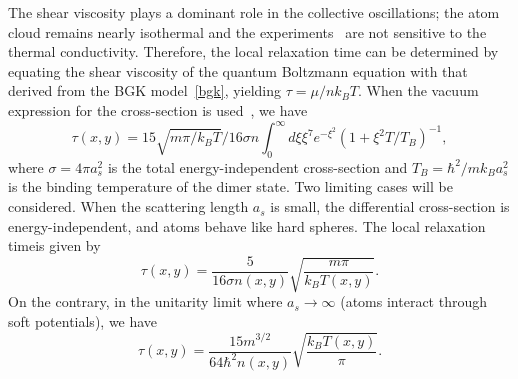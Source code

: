The shear viscosity plays a dominant role in the collective oscillations; the atom cloud remains nearly isothermal and the experiments~\cite{Kavoulakis1998,Braby2010} are not sensitive to the thermal conductivity. Therefore, the local relaxation time can be determined by equating the shear viscosity of the quantum Boltzmann equation with that derived from the BGK model~\eqref{bgk}, yielding $\tau=\mu/nk_BT$. When the vacuum expression for the cross-section is used~\cite{Massignan2005}, we have
\begin{equation}
\tau(x,y)={15}\sqrt{{m\pi}/{k_BT}}/{16\sigma n\int_0^\infty d\xi\xi^7e^{-\xi^2}(1+\xi^2T/T_B)^{-1}},
\end{equation} 
where $\sigma=4\pi a_s^2$ is the total energy-independent cross-section and $T_B=\hbar^2/mk_Ba_s^2$ is the binding temperature of the dimer state. Two limiting cases will be considered. When the scattering length $a_s$ is small, the differential cross-section is energy-independent, and atoms behave like hard spheres. The local relaxation timeis  given by~\cite{Massignan2005,Nikuni1998,Watabe2010}
\begin{equation}\label{nu_quantum}
\tau(x,y)=\frac{5}{16\sigma n(x,y)}\sqrt{\frac{m\pi}{k_BT(x,y)}}.
\end{equation}
On the contrary, in the unitarity limit where
$a_s\rightarrow\infty$ (atoms interact through soft potentials), we have
\begin{equation}\label{nu2}
\tau(x,y)=\frac{15m^{3/2}}{64\hbar^2n(x,y)}\sqrt{\frac{k_BT(x,y)}{\pi}}.
\end{equation}



%





